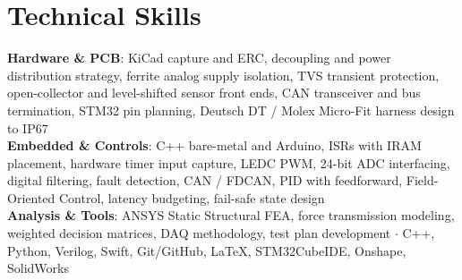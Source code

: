 \documentclass[letterpaper,9pt]{extarticle}
\begin{document}
\section{Technical Skills}
\begin{itemize}[leftmargin=0.14in,label={},topsep=1pt]
  \small{\item{
    \textbf{Hardware \& PCB}{: KiCad capture and ERC, decoupling and power distribution strategy, ferrite analog supply isolation, TVS transient protection, open-collector and level-shifted sensor front ends, CAN transceiver and bus termination, STM32 pin planning, Deutsch DT / Molex Micro-Fit harness design to IP67} \\
    \textbf{Embedded \& Controls}{: C++ bare-metal and Arduino, ISRs with IRAM placement, hardware timer input capture, LEDC PWM, 24-bit ADC interfacing, digital filtering, fault detection, CAN / FDCAN, PID with feedforward, Field-Oriented Control, latency budgeting, fail-safe state design} \\
    \textbf{Analysis \& Tools}{: ANSYS Static Structural FEA, force transmission modeling, weighted decision matrices, DAQ methodology, test plan development $\cdot$ C++, Python, Verilog, Swift, Git/GitHub, LaTeX, STM32CubeIDE, Onshape, SolidWorks}
  }}
\end{itemize}
\end{document}
